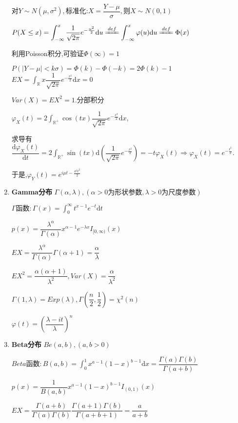 \begin{enumerate}
	对$Y\sim N(\mu, \sigma^2), $标准化:$X = \dfrac{Y - \mu}{\sigma},则 X\sim N(0,1)$

    $ P(X \le x) = \int_{-\infty}^{x}{\frac{1}{\sqrt{2\pi}}e^{-\frac{u^2}{2}}\mathrm{d}u} \xlongequal{def}\int_{-\infty}^{x}{\varphi(u)\mathrm{d}u}\xlongequal{def}\Phi(x)$

	利用Poisson积分,可验证$\Phi(\infty) = 1$

	$ P(|Y-\mu| < k\sigma) = \Phi(k) - \Phi(-k) = 2\Phi(k)-1$
    \\

  $EX = \int_{\mathbb{R}}{x\dfrac{1}{\sqrt{2\pi}}e^{-\frac{x^2}{2}}\mathrm{d}x} = 0$

	$ Var(X) = EX^2 = 1. 分部积分$

    $\varphi_X(t) = 2\int_{\mathbb{R}^+}\cos(tx)\dfrac{1}{\sqrt{2\pi}}e^{-\frac{x^2}{2}}\mathrm{d}x$,

    求导有$ \dfrac{\mathrm{d}\varphi_X(t)}{\mathrm{d}t} = 2\int_{\mathbb{R}^+}\sin(tx)\mathrm{d}(\dfrac{1}{\sqrt{2\pi}}e^{-\frac{x^2}{2}})
    = -t\varphi_X(t)\Rightarrow \varphi_X(t) = e^{-\frac{t^2}{2}}$.

    于是,$ \varphi_Y(t) = e^{i\mu t-\frac{\sigma^2t^2}{2}}$

\item \textbf{Gamma分布} $\Gamma(\alpha, \lambda),(\alpha > 0为形状参数,\lambda>0为尺度参数)$

    $ \Gamma 函数: \Gamma(x) = \int_{0}^{\infty}t^{x-1}e^{-t}\mathrm{d}t$

	$ p(x) = \dfrac{\lambda^{\alpha}}{\Gamma(\alpha)}x^{\alpha - 1}e^{-\lambda x}I_{[0,\infty)}(x)$

	$ EX = \dfrac{\lambda^{\alpha}}{\Gamma(\alpha)}\Gamma(\alpha+1) = \dfrac{\alpha}{\lambda}$

	$ EX^2 = \dfrac{\alpha(\alpha+1)}{\lambda^2},Var(X) = \dfrac{\alpha}{\lambda^2}$

	$ \Gamma(1,\lambda )= Exp(\lambda), \Gamma(\dfrac{n}{2},\dfrac{1}{2}) = \chi ^2(n)$

    $ \varphi(t) = (\dfrac{\lambda-it}{\lambda})^n$
  \item \textbf{Beta分布} $ Be(a,b),(a,b>0)$

    $ Beta函数:B(a,b) = \int_{0}^{1}{x^{a-1}(1-x)^{b-1}\mathrm{d}x} = \dfrac{\Gamma(a)\Gamma(b)}{\Gamma(a+b)}$

  $ p(x) = \dfrac{1}{B(a,b)}x^{a-1}(1-x)^{b-1}I_{(0,1)}(x)$

    $ EX = \dfrac{\Gamma(a+b)}{\Gamma(a)\Gamma(b)}\dfrac{\Gamma(a+1)\Gamma(b)}{\Gamma(a+b+1)} = \dfrac{a}{a+b}$


\end{enumerate}
